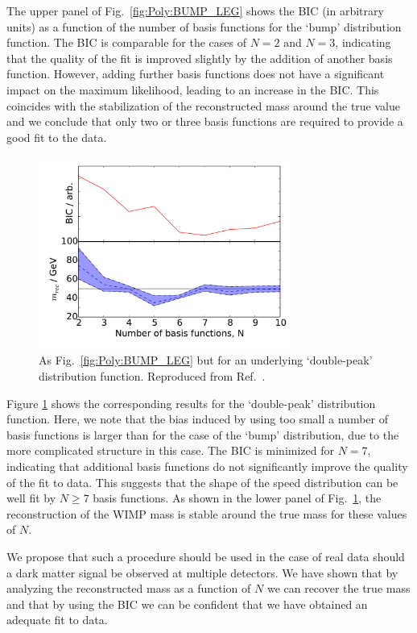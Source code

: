The upper panel of Fig.~\ref{fig:Poly:BUMP_LEG} shows the BIC (in arbitrary units) as a function of the number of basis functions for the `bump' distribution function. The BIC is comparable for the cases of $N=2$ and $N=3$, indicating that the quality of the fit is improved slightly by the addition of another basis function. However, adding further basis functions does not have a significant impact on the maximum likelihood, leading to an increase in the BIC. This coincides with the stabilization of the reconstructed mass around the true value and we conclude that only two or three basis functions are required to provide a good fit to the data.

\begin{figure}[t!]
\centering
  \includegraphics[width=0.75\textwidth]{Poly/VaryingN_DP_LEG.pdf}
  \caption{As Fig.~\ref{fig:Poly:BUMP_LEG} but for an underlying `double-peak' distribution function. Reproduced from Ref.~\cite{Kavanagh:2014}.}
  \label{fig:Poly:DP_LEG}
\end{figure}

Figure \ref{fig:Poly:DP_LEG} shows the corresponding results for the `double-peak' distribution function. Here, we note that the bias induced by using too small a number of basis functions is larger than for the case of the `bump' distribution, due to the more complicated structure in this case. The BIC is minimized for $N=7$, indicating that additional basis functions do not significantly improve the quality of the fit to data. This suggests that the shape of the speed distribution can be well fit by $N\geq7$ basis functions. As shown in the lower panel of Fig.~\ref{fig:Poly:DP_LEG}, the reconstruction of the WIMP mass is stable around the true mass for these values of $N$.

We propose that such a procedure should be used in the case of real data should a dark matter signal be observed at multiple detectors. We have shown that by analyzing the reconstructed mass as a function of $N$ we can recover the true mass and that by using the BIC we can be confident that we have obtained an adequate fit to data.


